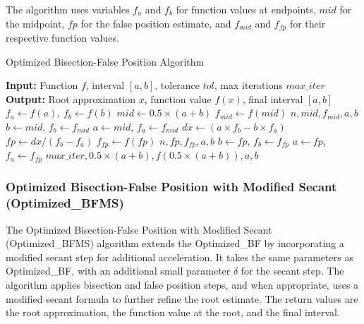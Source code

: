 \documentclass[reprint, amsmath, amssymb, aps, prl]{revtex4-2}
\begin{document}
The algorithm uses variables $f_a$ and $f_b$ for function values at endpoints, $mid$ for the midpoint, $fp$ for the false position estimate, and $f_{mid}$ and $f_{fp}$ for their respective function values.

\vspace{1em}
\begin{algorithm}[h!]
\caption{Optimized Bisection-False Position Algorithm}
\begin{algorithmic}[1]
\State \textbf{Input:} Function $f$, interval $[a, b]$, tolerance $tol$, max iterations $max\_iter$
\State \textbf{Output:} Root approximation $x$, function value $f(x)$, final interval $[a, b]$
\State $f_a \gets f(a)$, $f_b \gets f(b)$
    \State $mid \gets 0.5 \times (a + b)$
    \State $f_{mid} \gets f(mid)$
        \State \Return $n, mid, f_{mid}, a, b$
    \EndIf
        \State $b \gets mid$, $f_b \gets f_{mid}$
    \Else
        \State $a \gets mid$, $f_a \gets f_{mid}$
    \EndIf
    \State $dx \gets (a \times f_b - b \times f_a)$
    \State $fp \gets dx / (f_b - f_a)$
    \State $f_{fp} \gets f(fp)$
        \State \Return $n, fp, f_{fp}, a, b$
    \EndIf
        \State $b \gets fp$, $f_b \gets f_{fp}$
    \Else
        \State $a \gets fp$, $f_a \gets f_{fp}$
    \EndIf
\EndFor
\State \Return $max\_iter, 0.5 \times (a + b), f(0.5 \times (a + b)), a, b$
\end{algorithmic}
\end{algorithm}
\vspace{1em}

\subsubsection{Optimized Bisection-False Position with Modified Secant (Optimized\_BFMS)}

The Optimized Bisection-False Position with Modified Secant (Optimized\_BFMS) algorithm extends the Optimized\_BF by incorporating a modified secant step for additional acceleration. It takes the same parameters as Optimized\_BF, with an additional small parameter $\delta$ for the secant step. The algorithm applies bisection and false position steps, and when appropriate, uses a modified secant formula to further refine the root estimate. The return values are the root approximation, the function value at the root, and the final interval.
\end{document}
